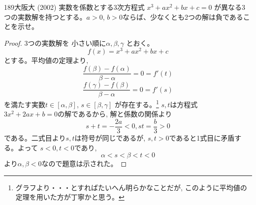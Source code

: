 \begin{thm}{189}{}{大阪大 (2002)}
 実数を係数とする3次方程式 $x^3+ax^2+bx+c=0$ が異なる3つの実数解を持つとする。$a>0$, $b>0$ならば、少なくとも2つの解は負であることを示せ。
\end{thm}

\begin{proof}
3つの実数解を 小さい順に$\alpha, \beta ,\gamma$ とおく。
\[f(x)=x^3+ax^2+bx+c\]
とする。平均値の定理より, 
\[\dfrac{f(\beta) -f(\alpha)}{\beta -\alpha}=0=f'(t) \]
\[\dfrac{f(\gamma) -f(\beta)}{\beta -\alpha}=0=f'(s) \]
を満たす実数$t\in [\alpha, \beta]$, $s\in [\beta , \gamma]$ が存在する。\footnote{グラフより・・・とすればたいへん明らかなことだが, このように平均値の定理を用いた方が丁寧かと思う。}
$s,t$は方程式 $3x^2 + 2ax +b=0$の解であるから, 解と係数の関係より
\[s+t=-\dfrac{2a}{3}<0,　　st=\dfrac{b}{3}>0\]
である。二式目より$s, t$は符号が同じであるが, $s,t>0$であると1式目に矛盾する。よって $s<0 , t<0$であり, 
\[\alpha< s< \beta < t<0\]
より$\alpha,\beta <0$なので題意は示された。%
\end{proof}